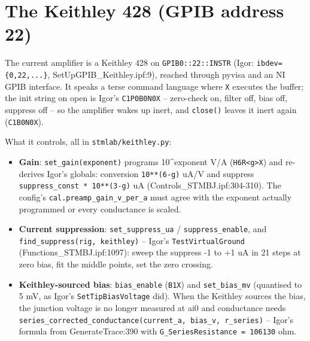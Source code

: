 \section{The Keithley 428 (GPIB address 22)}

The current amplifier is a Keithley 428 on \texttt{GPIB0::22::INSTR} (Igor: \texttt{ibdev=\{0,\discretionary{}{}{}22,\discretionary{}{}{}.\discretionary{}{}{}.\discretionary{}{}{}.\discretionary{}{}{}\}}, SetUpGPIB\_Keithley.ipf:9), reached through pyvisa and an NI GPIB interface. It speaks a terse command language where \texttt{X} executes the buffer; the init string on open is Igor's \texttt{C1P0B0N0X} -- zero-check on, filter off, bias off, suppress off -- so the amplifier wakes up inert, and \texttt{close()} leaves it inert again (\texttt{C1B0N0X}).

What it controls, all in \texttt{stmlab/\discretionary{}{}{}keithley.\discretionary{}{}{}py}:

\begin{itemize}[leftmargin=*]
\item \textbf{Gain}: \texttt{set\_\discretionary{}{}{}gain(exponent)} programs 10\textasciicircum{}exponent V/A (\texttt{H6R<g>X}) and re-derives Igor's globals: conversion \texttt{10**(6-g)} uA/V and suppress \texttt{suppress\_\discretionary{}{}{}const * 10**(3-g)} uA (Controls\_STMBJ.ipf:304-310). The config's \texttt{cal.\discretionary{}{}{}preamp\_\discretionary{}{}{}gain\_\discretionary{}{}{}v\_\discretionary{}{}{}per\_\discretionary{}{}{}a} must agree with the exponent actually programmed or every conductance is scaled.
\item \textbf{Current suppression}: \texttt{set\_\discretionary{}{}{}suppress\_\discretionary{}{}{}ua} / \texttt{suppress\_\discretionary{}{}{}enable}, and \texttt{find\_\discretionary{}{}{}suppress(rig,\discretionary{}{}{} keithley)} -- Igor's \texttt{Test\discretionary{}{}{}Virtual\discretionary{}{}{}Ground} (Functions\_STMBJ.ipf:1097): sweep the suppress -1 to +1 uA in 21 steps at zero bias, fit the middle points, set the zero crossing.
\item \textbf{Keithley-sourced bias}: \texttt{bias\_\discretionary{}{}{}enable} (\texttt{B1X}) and \texttt{set\_\discretionary{}{}{}bias\_\discretionary{}{}{}mv} (quantised to 5 mV, as Igor's \texttt{Set\discretionary{}{}{}Tip\discretionary{}{}{}Bias\discretionary{}{}{}Voltage} did). When the Keithley sources the bias, the junction voltage is no longer measured at ai0 and conductance needs \texttt{series\_\discretionary{}{}{}corrected\_\discretionary{}{}{}conductance(current\_\discretionary{}{}{}a,\discretionary{}{}{} bias\_\discretionary{}{}{}v,\discretionary{}{}{} r\_\discretionary{}{}{}series)} -- Igor's formula from GenerateTrace:390 with \texttt{G\_\discretionary{}{}{}Series\discretionary{}{}{}Resistance = 106130} ohm.
\end{itemize}

